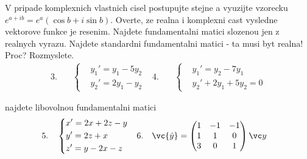 V pripade komplexnich vlastnich cisel postupujte stejne a vyuzijte vzorecku\\ 
 $e^{a+ib}=e^a(\cos b+i\sin b)$. Overte, ze realna i komplexni cast 
 vysledne vektorove funkce je resenim. Najdete fundamentalni matici slozenou jen z realnych
 vyrazu. Najdete standardni fundamentalni matici - ta musi byt realna! Proc? Rozmyslete.
 \begin{align*}
   3.&\quad
   \left\{
   \begin{aligned}
     &y_1'=y_1-5y_2\\
     &y_2'=2y_1-y_2
   \end{aligned}\right.
   &
   4.&\quad
   \left\{
   \begin{aligned}
     &y_1'=y_2-7y_1\\
     &y_2'+2y_1+5y_2=0
   \end{aligned}\right.
\end{align*}

najdete libovolnou fundamentalni matici
\begin{align*}
   5.&\quad
   \left\{
   \begin{aligned}
     &x'=2x+2z-y\\
     &y'=2z+x\\
     &z'=y-2x-z
   \end{aligned}\right.
   &
   6.&\quad
   \vc{\dot y}=\left(\begin{matrix}
                       1&-1&-1\\
                       1&1&0\\
                       3&0&1
                     \end{matrix}\right)\vc y
\end{align*}



